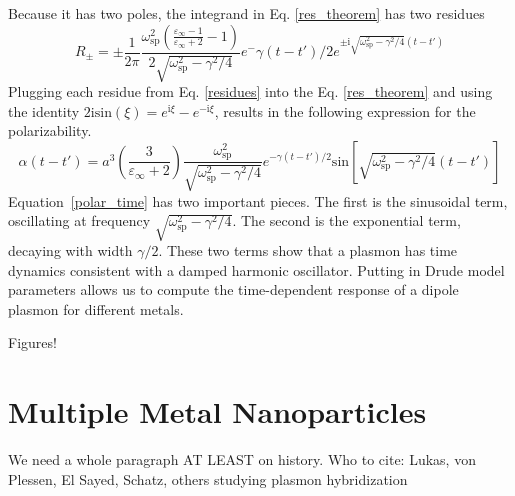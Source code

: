 \documentclass [11pt, proquest] {uwthesis}[2016/11/22]
\begin{document}
Because it has two poles, the integrand in Eq. \ref{res_theorem} has two residues
\begin{equation}
R_{\pm} = \pm\frac{1}{2\pi}\frac{\omega_{\textrm{sp}}^2\left(\frac{\varepsilon_{\infty}-1}{\varepsilon_{\infty}+2}-1\right)}{2\sqrt{\omega_\textrm{sp}^2-\gamma^2/4}}e^-{\gamma (t-t')/2}e^{\pm\textrm{i}\sqrt{\omega_\textrm{sp}^2-\gamma^2/4}(t-t')}
\label{residues}
\end{equation}
Plugging each residue from Eq. \ref{residues} into the Eq. \ref{res_theorem} and using the identity $2\textrm{i}\textrm{sin}(\xi) = e^{\textrm{i}\xi} - e^{-\textrm{i}\xi}$, results in the following expression for the polarizability.
\begin{equation}
\alpha(t-t') = a^3\left(\frac{3}{\varepsilon_{\infty}+2}\right)\frac{\omega_{\textrm{sp}}^2}{\sqrt{\omega_\textrm{sp}^2-\gamma^2/4}}e^{-\gamma (t-t')/2}\textrm{sin}\left[\sqrt{\omega_{\textrm{sp}}^2-\gamma^2/4}(t-t')\right]
\label{polar_time}
\end{equation}
Equation~\ref{polar_time} has two important pieces. The first is the sinusoidal term, oscillating at frequency $\sqrt{\omega_\textrm{sp}^2-\gamma^2/4}$. The second is the exponential term, decaying with width $\gamma/2$. These two terms show that a plasmon has time dynamics consistent with a damped harmonic oscillator. Putting in Drude model parameters allows us to compute the time-dependent response of a dipole plasmon for different metals.

Figures! 

\section{Multiple Metal Nanoparticles}

We need a whole paragraph AT LEAST on history.
Who to cite: Lukas, von Plessen, El Sayed, Schatz, others studying plasmon hybridization
\end{document}
